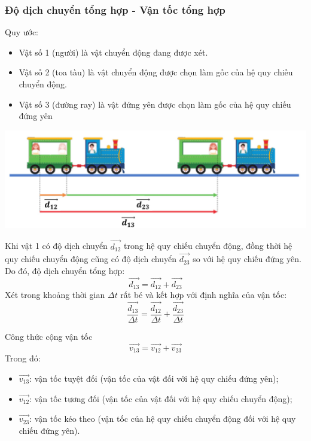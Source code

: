 \begin{tomtat}
	\subsubsection{Độ dịch chuyển tổng hợp - Vận tốc tổng hợp}
	Quy ước:
	\begin{itemize}
		\item Vật số 1 (người) là vật chuyển động đang được xét.
		\item Vật số 2 (toa tàu) là vật chuyển động được chọn làm gốc của hệ quy chiếu chuyển động.
		\item Vật số 3 (đường ray) là vật đứng yên được chọn làm gốc của hệ quy chiếu đứng yên
	\end{itemize}
	\begin{center}
		\includegraphics[scale=0.5]{figs/G10Y25B4-1}
	\end{center}
	Khi vật 1 có độ dịch chuyển $\overrightarrow{d_{12}}$ trong hệ quy chiếu chuyển động, đồng thời hệ quy chiếu chuyển động cũng có độ dịch chuyển $\overrightarrow{d_{23}}$ so với hệ quy chiếu đứng yên. Do đó, độ dịch chuyển tổng hợp:
	$$\overrightarrow{d_{13}}=\overrightarrow{d_{12}}+\overrightarrow{d_{23}}$$
	Xét trong khoảng thời gian $\Delta t$ rất bé và kết hợp với định nghĩa của vận tốc:
	$$\dfrac{\overrightarrow{d_{13}}}{\Delta t}=\dfrac{\overrightarrow{d_{12}}}{\Delta t}+\dfrac{\overrightarrow{d_{23}}}{\Delta t}$$
	\begin{noidung}{Công thức cộng vận tốc}
			$$\overrightarrow{v_{13}}=\overrightarrow{v_{12}}+\overrightarrow{v_{23}}$$
		Trong đó:
		\begin{itemize}
			\item $\overrightarrow{v_{13}}$: vận tốc tuyệt đối (vận tốc của vật đối với hệ quy chiếu đứng yên);
			\item $\overrightarrow{v_{12}}$: vận tốc tương đối (vận tốc của vật đối với hệ quy chiếu chuyển động);
			\item $\overrightarrow{v_{23}}$: vận tốc kéo theo (vận tốc của hệ quy chiếu chuyển động đối với hệ quy chiếu đứng yên).
		\end{itemize}
	\end{noidung}


\end{tomtat}
